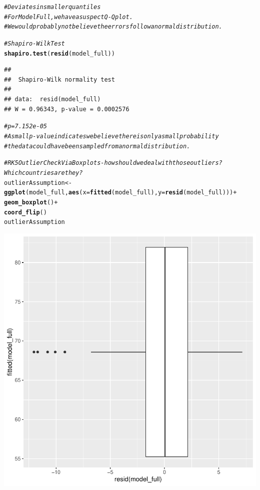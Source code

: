 \documentclass{article}\usepackage[]{graphicx}\usepackage[]{color}
\makeatletter
\newcommand{\hlcom}[1]{\textcolor[rgb]{0.678,0.584,0.686}{\textit{#1}}}%
\newcommand{\hlopt}[1]{\textcolor[rgb]{0,0,0}{#1}}%
\newcommand{\hlstd}[1]{\textcolor[rgb]{0.345,0.345,0.345}{#1}}%
\newcommand{\hlkwb}[1]{\textcolor[rgb]{0.69,0.353,0.396}{#1}}%
\newcommand{\hlkwc}[1]{\textcolor[rgb]{0.333,0.667,0.333}{#1}}%
\newcommand{\hlkwd}[1]{\textcolor[rgb]{0.737,0.353,0.396}{\textbf{#1}}}%
\newenvironment{kframe}{%
 \def\at@end@of@kframe{}%
 \ifinner\ifhmode%
  \def\at@end@of@kframe{\end{minipage}}%
  \begin{minipage}{\columnwidth}%
 \fi\fi%
 \def\FrameCommand##1{\hskip\@totalleftmargin \hskip-\fboxsep
 \colorbox{shadecolor}{##1}\hskip-\fboxsep
     \hskip-\linewidth \hskip-\@totalleftmargin \hskip\columnwidth}%
 \MakeFramed {\advance\hsize-\width
   \@totalleftmargin\z@ \linewidth\hsize
   \@setminipage}}%
 {\par\unskip\endMakeFramed%
 \at@end@of@kframe}
\newenvironment{knitrout}{}{} %
\makeatother
\begin{document}
\begin{knitrout}
{}


\begin{kframe}\begin{alltt}
\hlcom{# Deviates in smaller quantiles}
\hlcom{# For Model Full, we have a suspect Q-Q plot. }
\hlcom{# We would probably not believe the errors follow a normal distribution.}

\hlcom{# Shapiro-Wilk Test}
\hlkwd{shapiro.test}\hlstd{(}\hlkwd{resid}\hlstd{(model_full))}
\end{alltt}
\begin{verbatim}
## 
## 	Shapiro-Wilk normality test
## 
## data:  resid(model_full)
## W = 0.96343, p-value = 0.0002576
\end{verbatim}
\begin{alltt}
\hlcom{# p = 7.152e-05}
\hlcom{# A small p-value indicates we believe there is only a small probability }
\hlcom{# the data could have been sampled from a normal distribution.}

\hlcom{#RK 5 Outlier Check Via Boxplots- how should we deal with those outliers? Which countries are they? }
\hlstd{outlierAssumption} \hlkwb{<-} \hlkwd{ggplot}\hlstd{(model_full,} \hlkwd{aes}\hlstd{(}\hlkwc{x}\hlstd{=}\hlkwd{fitted}\hlstd{(model_full),} \hlkwc{y}\hlstd{=}\hlkwd{resid}\hlstd{(model_full)))} \hlopt{+}
  \hlkwd{geom_boxplot}\hlstd{()} \hlopt{+}
  \hlkwd{coord_flip}\hlstd{()}
\hlstd{outlierAssumption}
\end{alltt}


{\ttfamily\noindent\color{warningcolor}{\#\# Warning: Continuous x aesthetic -- did you forget aes(group=...)?}}\end{kframe}

{\centering \includegraphics[width=.6\linewidth]{figure/Analysis-Rnwauto-report-24} 

}
\end{knitrout}
\end{document}
